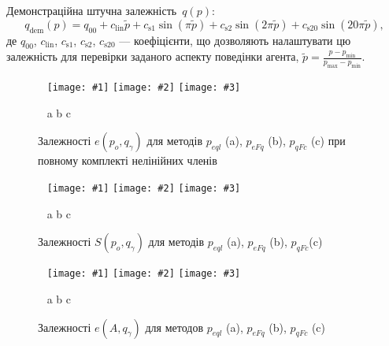 \documentclass[14pt,handout,utf8]{beamer}
\newcommand{\Xhead}[1]{
 \begin{center}%
      \textbf{#1}%
 \end{center}%
}
\newcommand{\ABClbl}{%
  \vspace{-2.7ex}
  \begin{center}
    ~ \hfill a \hfill\hfill b \hfill\hfill c \hfill ~
  \end{center}
  \vspace{-2.0ex}
}
\newcommand{\PicTriple}[3]{%
 \begin{center}
    ~ \hfill
    \texttt{[image: \#1]}
    \hfill
    \texttt{[image: \#2]}
    \hfill
    \texttt{[image: \#3]}
    \hfill ~
  \end{center}
  \ABClbl
}
\begin{document}

\begin{frame}
  \frametitle{~}

  Демонстраційна штучна залежність~$q(p)$:
  \begin{equation}
    q_\mathrm{dem}(p) = q_{00} + c_\mathrm{lin} \tilde{p} + c_\mathrm{s1} \sin( \pi \tilde{p} ) + c_\mathrm{s2} \sin( 2 \pi \tilde{p} ) + c_\mathrm{s20} \sin( 20 \pi \tilde{p} ),
    \label{atu:eq:q_dem}
  \end{equation}
  де $q_{00}$, $c_\mathrm{lin}$, $c_\mathrm{s1}$, $c_\mathrm{s2}$, $c_\mathrm{s20}$
  ---
  коефіцієнти, що дозволяють налаштувати цю залежність для перевірки заданого аспекту поведінки агента,
  $\tilde{p} = \frac{p - p_{\min}}{p_{\max} - p_{\min}}$.

  \begin{figure}
    \PicTriple{../p3/p/qls_pe-p_po_qg_eql_all_xl.png}{../p3/p/qls_pe-p_po_qg_eFq_all_xl.png}{../p3/p/qls_pe-p_po_qg_eFc_all_xl.png}
    \caption{Залежності $e(p_o,q_\gamma)$ для методів $p_{eql}$ (a), $p_{eFq}$ (b), $p_{qFc}$ (c) при повному комплекті нелінійних членів}
    \label{atu:f:qsl_pe_po_qg_all}
  \end{figure}

  \begin{figure}
    \PicTriple{../p3/p/qls_pe-p_po_qg_Sql_all_xl.png}{../p3/p/qls_pe-p_po_qg_SFq_all_xl.png}{../p3/p/qls_pe-p_po_qg_SFc_all_xl.png}
    \caption{Залежності $S(p_o,q_\gamma)$ для методів $p_{eql}$ (a), $p_{eFq}$ (b), $p_{qFc}$(c)}
    \label{atu:f:qsl_S_po_qg_all}
  \end{figure}

  \vspace{-3ex}

  \begin{figure}[htb!]
    \PicTriple{../p3/p/qls_pe-p_A_qg_eql_all_xl.png}{../p3/p/qls_pe-p_A_qg_eFq_all_xl.png}{../p3/p/qls_pe-p_A_qg_eFc_all_xl.png}
    \caption{Залежності $e(A,q_\gamma)$ для методов $p_{eql}$ (a), $p_{eFq}$ (b), $p_{qFc}$ (c)}
    \label{atu:f:qsl_pe_A_qg_all}
  \end{figure}
\end{frame}


\end{document}
